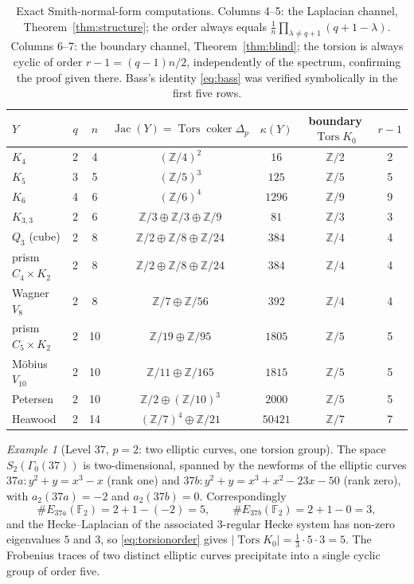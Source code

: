 \documentclass[11pt]{amsart}
\numberwithin{equation}{section}
\theoremstyle{definition}
\theoremstyle{remark}
\newtheorem{example}[theorem]{Example}
\newcommand{\Z}{\mathbb{Z}}
\newcommand{\F}{\mathbb{F}}
\newcommand{\coker}{\operatorname{coker}}
\newcommand{\Tors}{\operatorname{Tors}}
\newcommand{\Jac}{\operatorname{Jac}}
\begin{document}
\begin{table}[t]
\centering\small
\renewcommand{\arraystretch}{1.15}\setlength{\tabcolsep}{5pt}
\begin{tabular}{lccccc c}
\toprule
$Y$ & $q$ & $n$ & $\Jac(Y)=\Tors\coker\Delta_p$ & $\kappa(Y)$ & boundary $\Tors K_0$ & $r-1$\\
\midrule
$K_4$              &2& 4&$(\Z/4)^2$                   &$16$    &$\Z/2$&2\\
$K_5$              &3& 5&$(\Z/5)^3$                   &$125$   &$\Z/5$&5\\
$K_6$              &4& 6&$(\Z/6)^4$                   &$1296$  &$\Z/9$&9\\
$K_{3,3}$          &2& 6&$\Z/3\oplus\Z/3\oplus\Z/9$   &$81$    &$\Z/3$&3\\
$Q_3$ (cube)       &2& 8&$\Z/2\oplus\Z/8\oplus\Z/24$  &$384$   &$\Z/4$&4\\
prism $C_4\times K_2$&2& 8&$\Z/2\oplus\Z/8\oplus\Z/24$&$384$   &$\Z/4$&4\\
Wagner $V_8$       &2& 8&$\Z/7\oplus\Z/56$            &$392$   &$\Z/4$&4\\
prism $C_5\times K_2$&2&10&$\Z/19\oplus\Z/95$         &$1805$  &$\Z/5$&5\\
M\"obius $V_{10}$  &2&10&$\Z/11\oplus\Z/165$          &$1815$  &$\Z/5$&5\\
Petersen           &2&10&$\Z/2\oplus(\Z/10)^3$        &$2000$  &$\Z/5$&5\\
Heawood            &2&14&$(\Z/7)^4\oplus\Z/21$        &$50421$ &$\Z/7$&7\\
\bottomrule
\end{tabular}
\medskip
\caption{Exact Smith-normal-form computations. Columns 4--5: the Laplacian channel,
Theorem~\ref{thm:structure}; the order always equals
$\frac1n\prod_{\lambda\neq q+1}(q+1-\lambda)$. Columns 6--7: the boundary channel,
Theorem~\ref{thm:blind}; the torsion is always cyclic of order $r-1=(q-1)n/2$,
independently of the spectrum, confirming the proof given there. Bass's identity
\eqref{eq:bass} was verified symbolically in the first five rows.}
\label{tab:snf}
\end{table}

\begin{example}[Level $37$, $p=2$: two elliptic curves, one torsion group]\label{ex:37}
The space $S_2(\Gamma_0(37))$ is two-dimensional, spanned by the newforms of the
elliptic curves $37a: y^2+y=x^3-x$ (rank one) and $37b: y^2+y=x^3+x^2-23x-50$ (rank
zero), with $a_2(37a)=-2$ and $a_2(37b)=0$. Correspondingly
\[
\#E_{37a}(\F_2)=2+1-(-2)=5,\qquad \#E_{37b}(\F_2)=2+1-0=3,
\]
and the Hecke--Laplacian of the associated $3$-regular Hecke system has non-zero
eigenvalues $5$ and $3$, so \eqref{eq:torsionorder} gives
$|\Tors K_0|=\tfrac13\cdot5\cdot3=5$. The Frobenius traces of two distinct elliptic
curves precipitate into a single cyclic group of order five.
\end{example}
\end{document}
